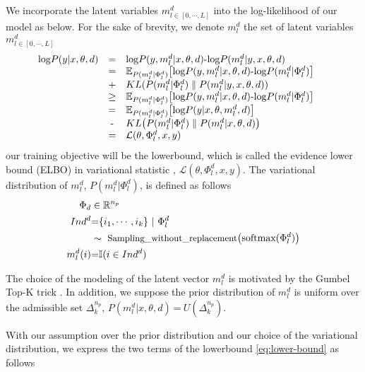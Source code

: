\documentclass[11pt]{article}
\begin{document}
We incorporate the latent variables $m_{l\in[0,\cdots,L]}^d$ into the log-likelihood of our model as below. For the sake of brevity, we denote $m_l^d$ the set of latent variables $m_{l\in[0,\cdots,L]}^d$
\begin{equation}
\hspace{-1.5em}
\begin{array}{rcl}
\text{log} P(y|x,\theta,d) & \text{=} & \text{log} P(y, m_l^d |x,\theta,d) \text{-} \text{log} P(m_l^d|y, x,\theta,d) \\
& \text{=} & \mathbb{E}_{P(m_l^d | \Phi_l^d)} \big[ \text{log} P(y, m_l^d | x,\theta,d) \text{-} \text{log} P(m_l^d | \Phi_l^d) \big] \\
& \text{+} & KL(P(m_l^d | \Phi_l^d) \parallel P(m_l^d|y, x,\theta,d)) \\
& \geq & \mathbb{E}_{P(m_l^d | \Phi_l^d)} \big[ \text{log} P(y, m_l^d | x,\theta,d) \text{-} \text{log} P(m_l^d | \Phi_l^d) \big]  \\
& \text{=} & \mathbb{E}_{P(m_l^d | \Phi_l^d)} \big[ \text{log} P(y | x,\theta,m_l^d, d) \big] \\
& \text{-} & KL \big( P(m_l^d | \Phi_l^d) \parallel P(m_l^d | x,\theta,d) \big) \\
& \text{=} & \mathcal{L}(\theta, \Phi_l^d, x , y) \label{eq:lower-bound}
\end{array}
\end{equation}
our training objective will be the lowerbound, which is called the evidence lower bound (ELBO) in variational statistic \citep{Diederick14auto}, $\mathcal{L}(\theta, \Phi_l^d, x , y)$. The variational distribution of $m_l^d$, $P(m_l^d|\Phi_l^d)$, is defined as follows
\begin{align*}
\Phi_d & \in \mathbb{R}^{n_p} \\
Ind^d & \text{=} \{ i_1, \cdots, i_k \} \ | \ \Phi_l^d \\
& \sim \ \text{\small Sampling\_without\_replacement} \big(\text{softmax}(\Phi_l^d) \big) \\
m_l^d(i) &\text{=} \mathbb{I}(i \in Ind^d) \\
\end{align*}

The choice of the modeling of the latent vector $m_l^d$ is motivated by the Gumbel Top-K trick \citep{Kool19stochastic}. In addition, we suppose the prior distribution of $m_l^d$ is uniform over the admissible set $\Delta^{n_p}_k$, $P(m_l^d | x, \theta, d) \ \text{=} \ U(\Delta^{n_p}_k)$.

With our assumption over the prior distribution and our choice of the variational distribution, we express the two terms of the lowerbound \eqref{eq:lower-bound} as follows
\end{document}
